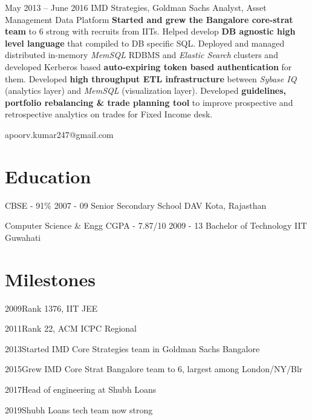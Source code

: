 \documentclass{tccv}
\begin{document}
\begin{eventlist}
\item{May 2013 -- June 2016}
     {IMD Strategies, Goldman Sachs}
     {Analyst, Asset Management Data Platform}
	\textbf{Started and grew the Bangalore core-strat team} to 6 strong with recruits from IITs.\newline
	Helped develop \textbf{DB agnostic high level language} that compiled to DB specific SQL.\newline
	Deployed and managed distributed in-memory \textit{MemSQL} RDBMS and \textit{Elastic Search} clusters and developed Kerberos based \textbf{auto-expiring token based authentication} for them. \newline
	Developed \textbf{high throughput ETL infrastructure} between \textit{Sybase IQ} (analytics layer) and \textit{MemSQL} (visualization layer).\newline
	Developed \textbf{guidelines, portfolio rebalancing \& trade planning tool} to improve prospective and retrospective analytics on trades for Fixed Income desk.



\end{eventlist}



    {apoorv.kumar247@gmail.com}

\section{Education}

\begin{yearlist}

\item[CBSE - 91\%]{2007 - 09}
     {Senior Secondary School}
     {DAV Kota, Rajasthan}

\item[Computer Science \& Engg \newline CGPA - 7.87/10]{2009 - 13}
     {Bachelor of Technology}
     {IIT Guwahati}

\end{yearlist}

\section{Milestones}

\begin{factlist}
	\item{2009}{Rank 1376, IIT JEE}
	\item{2011}{Rank 22, ACM ICPC Regional}
	\item{2013}{Started IMD Core Strategies team in Goldman Sachs Bangalore}
	\item{2015}{Grew IMD Core Strat Bangalore team to 6, largest among London/NY/Blr}
	\item{2017}{Head of engineering at Shubh Loans}
	\item{2019}{Shubh Loans tech team now  strong}
\end{factlist}
\end{document}

